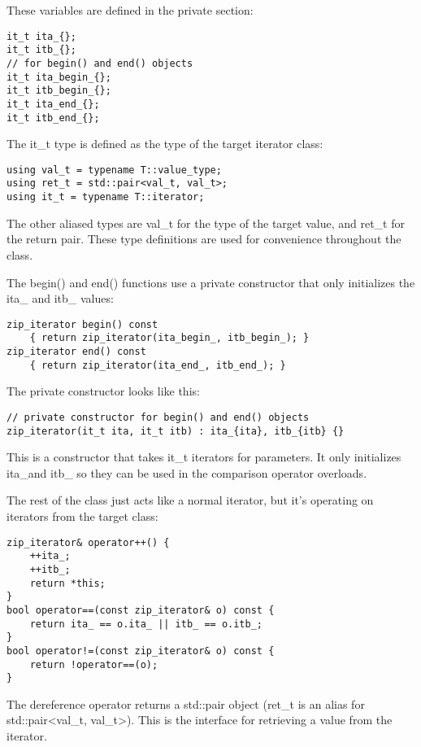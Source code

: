 These variables are defined in the private section:

\begin{lstlisting}[style=styleCXX]
it_t ita_{};
it_t itb_{};
// for begin() and end() objects
it_t ita_begin_{};
it_t itb_begin_{};
it_t ita_end_{};
it_t itb_end_{};
\end{lstlisting}

The it\_t type is defined as the type of the target iterator class:

\begin{lstlisting}[style=styleCXX]
using val_t = typename T::value_type;
using ret_t = std::pair<val_t, val_t>;
using it_t = typename T::iterator;
\end{lstlisting}

The other aliased types are val\_t for the type of the target value, and ret\_t for the return pair. These type definitions are used for convenience throughout the class.

The begin() and end() functions use a private constructor that only initializes the ita\_ and itb\_ values:

\begin{lstlisting}[style=styleCXX]
zip_iterator begin() const
	{ return zip_iterator(ita_begin_, itb_begin_); }
zip_iterator end() const
	{ return zip_iterator(ita_end_, itb_end_); }
\end{lstlisting}

The private constructor looks like this:

\begin{lstlisting}[style=styleCXX]
// private constructor for begin() and end() objects
zip_iterator(it_t ita, it_t itb) : ita_{ita}, itb_{itb} {}
\end{lstlisting}

This is a constructor that takes it\_t iterators for parameters. It only initializes ita\_and itb\_ so they can be used in the comparison operator overloads.

The rest of the class just acts like a normal iterator, but it's operating on iterators from the target class:

\begin{lstlisting}[style=styleCXX]
zip_iterator& operator++() {
	++ita_;
	++itb_;
	return *this;
}
bool operator==(const zip_iterator& o) const {
	return ita_ == o.ita_ || itb_ == o.itb_;
}
bool operator!=(const zip_iterator& o) const {
	return !operator==(o);
}
\end{lstlisting}

The dereference operator returns a std::pair object (ret\_t is an alias for std::pair<val\_t, val\_t>). This is the interface for retrieving a value from the iterator.

